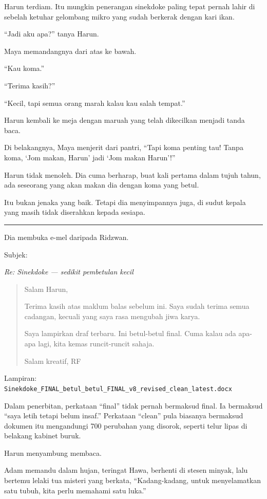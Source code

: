 \documentclass[
  11pt,
  a5paper,
  openany,
  oneside]{book}
\begin{document}
Harun terdiam. Itu mungkin penerangan sinekdoke paling tepat pernah
lahir di sebelah ketuhar gelombang mikro yang sudah berkerak dengan kari
ikan.

``Jadi aku apa?'' tanya Harun.

Maya memandangnya dari atas ke bawah.

``Kau koma.''

``Terima kasih?''

``Kecil, tapi semua orang marah kalau kau salah tempat.''

Harun kembali ke meja dengan maruah yang telah dikecilkan menjadi tanda
baca.

Di belakangnya, Maya menjerit dari pantri, ``Tapi koma penting tau!
Tanpa koma, `Jom makan, Harun' jadi `Jom makan Harun'!''

Harun tidak menoleh. Dia cuma berharap, buat kali pertama dalam tujuh
tahun, ada seseorang yang akan makan dia dengan koma yang betul.

Itu bukan jenaka yang baik. Tetapi dia menyimpannya juga, di sudut
kepala yang masih tidak diserahkan kepada sesiapa.

\begin{center}\rule{0.5\linewidth}{0.5pt}\end{center}

Dia membuka e-mel daripada Ridzwan.

Subjek:

\emph{Re: Sinekdoke --- sedikit pembetulan kecil}

\begin{quote}
Salam Harun,

Terima kasih atas maklum balas sebelum ini. Saya sudah terima semua
cadangan, kecuali yang saya rasa mengubah jiwa karya.

Saya lampirkan draf terbaru. Ini betul-betul final. Cuma kalau ada
apa-apa lagi, kita kemas runcit-runcit sahaja.

Salam kreatif, RF
\end{quote}

Lampiran:
\texttt{Sinekdoke\_FINAL\_betul\_betul\_FINAL\_v8\_revised\_clean\_latest.docx}

Dalam penerbitan, perkataan ``final'' tidak pernah bermaksud final. Ia
bermaksud ``saya letih tetapi belum insaf.'' Perkataan ``clean'' pula
biasanya bermaksud dokumen itu mengandungi 700 perubahan yang disorok,
seperti telur lipas di belakang kabinet buruk.

Harun menyambung membaca.

Adam memandu dalam hujan, teringat Hawa, berhenti di stesen minyak, lalu
bertemu lelaki tua misteri yang berkata, ``Kadang-kadang, untuk
menyelamatkan satu tubuh, kita perlu memahami satu luka.''
\end{document}
